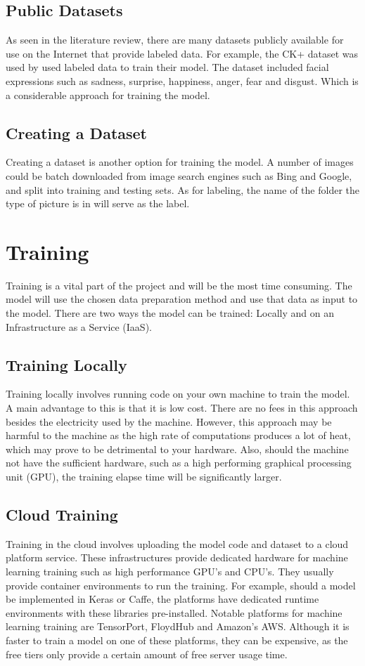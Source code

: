 \subsection{Public Datasets}
As seen in the literature review, there are many datasets publicly available for use on the Internet that provide labeled data. For example, the CK+ dataset was used by \citeauthor{LOPES} used labeled data to train their model. The dataset included facial expressions such as sadness, surprise, happiness, anger, fear and disgust. Which is a considerable approach for training the model.

\subsection{Creating a Dataset}
Creating a dataset is another option for training the model. A number of images could be batch downloaded from image search engines such as Bing and Google, and split into training and testing sets. As for labeling, the name of the folder the type of picture is in will serve as the label.

\section{Training}
Training is a vital part of the project and will be the most time consuming. The model will use the chosen data preparation method and use that data as input to the model. There are two ways the model can be trained: Locally and on an Infrastructure as a Service (IaaS).

\subsection{Training Locally}
Training locally involves running code on your own machine to train the model. A main advantage to this is that it is low cost. There are no fees in this approach besides the electricity used by the machine. However, this approach may be harmful to the machine as the high rate of computations produces a lot of heat, which may prove to be detrimental to your hardware. Also, should the machine not have the sufficient hardware, such as a high performing graphical processing unit (GPU), the training elapse time will be significantly larger.

\subsection{Cloud Training}
Training in the cloud involves uploading the model code and dataset to a cloud platform service. These infrastructures provide dedicated hardware for machine learning training such as high performance GPU's and CPU's. They usually provide container environments to run the training. For example, should a model be implemented in Keras or Caffe, the platforms have dedicated runtime environments with these libraries pre-installed. Notable platforms for machine learning training are TensorPort, FloydHub and Amazon's AWS. Although it is faster to train a model on one of these platforms, they can be expensive, as the free tiers only provide a certain amount of free server usage time.


